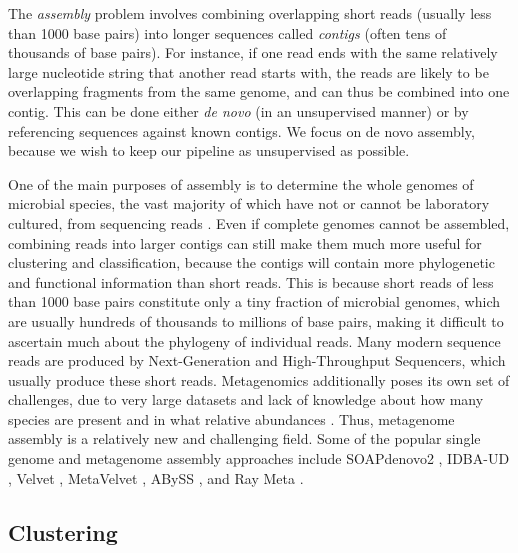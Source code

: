 The \emph{assembly} problem involves combining overlapping short reads (usually less than 1000 base pairs) into longer sequences called \emph{contigs} (often tens of thousands of base pairs). For instance, if one read ends with the same relatively large nucleotide string that another read starts with, the reads are likely to be overlapping fragments from the same genome, and can thus be combined into one contig. This can be done either \emph{de novo} (in an unsupervised manner) or by referencing sequences against known contigs. We focus on de novo assembly, because we wish to keep our pipeline as unsupervised as possible. 

One of the main purposes of assembly is to determine the whole genomes of microbial species, the vast majority of which have not or cannot be laboratory cultured, from sequencing reads \cite{zerbino08}. Even if complete genomes cannot be assembled, combining reads into larger contigs can still make them much more useful for clustering and classification, because the contigs will contain more phylogenetic and functional information than short reads. This is because short reads of less than 1000 base pairs constitute only a tiny fraction of microbial genomes, which are usually hundreds of thousands to millions of base pairs, making it difficult to ascertain much about the phylogeny of individual reads. Many modern sequence reads are produced by Next-Generation and High-Throughput Sequencers, which usually produce these short reads. Metagenomics additionally poses its own set of challenges, due to very large datasets and lack of knowledge about how many species are present and in what relative abundances \cite{namiki12}. Thus, metagenome assembly is a relatively new and challenging field. Some of the popular single genome and metagenome assembly approaches include SOAPdenovo2 \cite{luo12}, IDBA-UD \cite{peng12}, Velvet \cite{zerbino08}, MetaVelvet \cite{namiki12}, ABySS \cite{simpson09}, and Ray Meta \cite{boisvert12}.

\subsection{Clustering}



